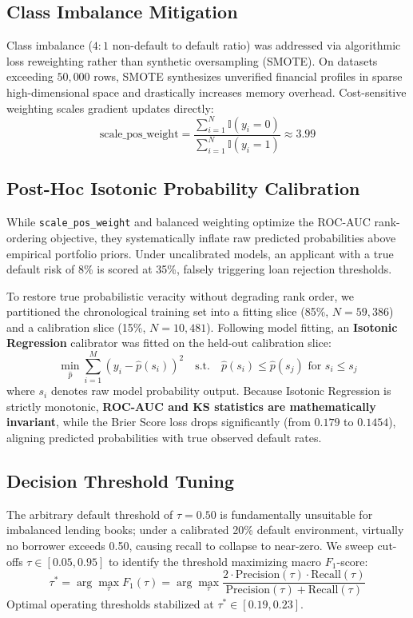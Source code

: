 \documentclass[conference]{IEEEtran}
\begin{document}
\subsection{Class Imbalance Mitigation}
Class imbalance ($4:1$ non-default to default ratio) was addressed via algorithmic loss reweighting rather than synthetic oversampling (SMOTE). On datasets exceeding $50,000$ rows, SMOTE synthesizes unverified financial profiles in sparse high-dimensional space and drastically increases memory overhead. Cost-sensitive weighting scales gradient updates directly:
\begin{equation}
\text{scale\_pos\_weight} = \frac{\sum_{i=1}^N \mathbb{I}(y_i = 0)}{\sum_{i=1}^N \mathbb{I}(y_i = 1)} \approx 3.99
\end{equation}

\subsection{Post-Hoc Isotonic Probability Calibration}
While \texttt{scale\_pos\_weight} and balanced weighting optimize the ROC-AUC rank-ordering objective, they systematically inflate raw predicted probabilities above empirical portfolio priors. Under uncalibrated models, an applicant with a true default risk of 8\% is scored at 35\%, falsely triggering loan rejection thresholds.

To restore true probabilistic veracity without degrading rank order, we partitioned the chronological training set into a fitting slice (85\%, $N = 59,386$) and a calibration slice (15\%, $N = 10,481$). Following model fitting, an \textbf{Isotonic Regression} calibrator was fitted on the held-out calibration slice:
\begin{equation}
\min_{\hat{p}} \sum_{i=1}^M \left( y_i - \hat{p}(s_i) \right)^2 \quad \text{s.t.} \quad \hat{p}(s_i) \le \hat{p}(s_j) \text{ for } s_i \le s_j
\end{equation}
where $s_i$ denotes raw model probability output. Because Isotonic Regression is strictly monotonic, \textbf{ROC-AUC and KS statistics are mathematically invariant}, while the Brier Score loss drops significantly (from $0.179$ to $0.1454$), aligning predicted probabilities with true observed default rates.

\subsection{Decision Threshold Tuning}
The arbitrary default threshold of $\tau = 0.50$ is fundamentally unsuitable for imbalanced lending books; under a calibrated 20\% default environment, virtually no borrower exceeds 0.50, causing recall to collapse to near-zero. We sweep cut-offs $\tau \in [0.05, 0.95]$ to identify the threshold maximizing macro $F_1$-score:
\begin{equation}
\tau^* = \arg\max_{\tau} F_1(\tau) = \arg\max_{\tau} \frac{2 \cdot \text{Precision}(\tau) \cdot \text{Recall}(\tau)}{\text{Precision}(\tau) + \text{Recall}(\tau)}
\end{equation}
Optimal operating thresholds stabilized at $\tau^* \in [0.19, 0.23]$.
\end{document}
